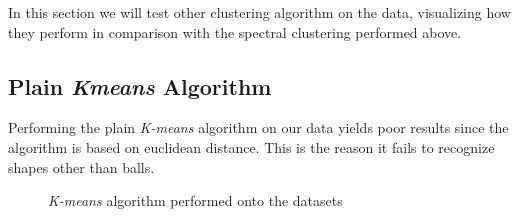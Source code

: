 In this section we will test other clustering algorithm on the data, visualizing how they perform in comparison with the spectral clustering performed above.

\subsection{Plain \textit{Kmeans} Algorithm}
Performing the plain \textit{K-means} algorithm on our data yields poor results since the algorithm is based on euclidean distance. This is the reason it fails to recognize shapes other than balls.

\begin{figure}[H]
    \centering
    \qquad
    \qquad
    \caption{\textit{K-means} algorithm performed onto the datasets}
    \label{kmeans_nospectral}
  \end{figure}

